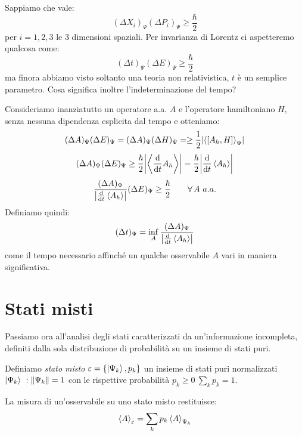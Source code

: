 Sappiamo che vale: 
\[
    (\Delta X_i )_{\Psi} (\Delta P_i )_\Psi \geq \frac{\hbar}{2}
\]
per \(i = 1,2,3\) le 3 dimensioni spaziali. Per invarianza di Lorentz ci aspetteremo qualcosa come:
\begin{equation}
    (\Delta t)_{\Psi}(\Delta E)_\Psi \geq \frac{\hbar}{2}
\end{equation}
ma finora abbiamo visto soltanto una teoria non relativistica, \(t\) è un semplice parametro. Cosa significa inoltre l'indeterminazione del tempo?

Consideriamo inanziatutto un operatore a.a. \(A\) e l'operatore hamiltoniano \(H\), senza nessuna dipendenza esplicita dal tempo e otteniamo:
\[
    (\Delta A)_{\Psi} (\Delta E)_\Psi = (\Delta A)_{\Psi} (\Delta H)_\Psi = \geq \frac{1}{2} \abs{\expval{\left[ A_h,H \right]}_\Psi}
\]
\[
    (\Delta A)_{\Psi} (\Delta E)_\Psi  \geq \frac{\hbar}{2}\abs{\expval{\dv{t}A_h}} =\frac{\hbar}{2}\abs{\dv{t}\expval{A_h}}
\]
\[
    \frac{ (\Delta A)_{\Psi} }{\abs{\dv{t}\expval{A_h}}}(\Delta E)_\Psi  \geq \frac{\hbar}{2} \qquad    \forall \, A \ a.a.
\]
Definiamo quindi:
\begin{equation}
    (\Delta t)_{\Psi} =  \inf_{A} \frac{ (\Delta A)_{\Psi} }{\abs{\dv{t}\expval{A_h}}}
\end{equation}
come il tempo necessario affinché un qualche osservabile \(A\) vari in maniera significativa.



\section{Stati misti}
\label{sec: mat_dens}

Passiamo ora all'analisi degli stati caratterizzati da un'informazione incompleta, definiti dalla sola distribuzione di probabilità su un insieme di stati puri.

\begin{definition}
    Definiamo \textit{stato misto} \(\varepsilon = \left\{ \ket{\Psi_k}, p_k \right\}\) un insieme di stati puri normalizzati \(\ket{\Psi_k}\ : \norm{\Psi_k} = 1\) con le rispettive probabilità \(p_k \geq 0 \ \sum_k p_k = 1\).
\end{definition}

La misura di un'osservabile su uno stato misto restituisce:
\begin{equation}
    \expval{A}_\varepsilon = \sum_k p_k \expval{A}_{\Psi_k}
\end{equation}

